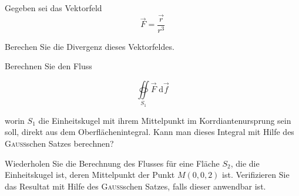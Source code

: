\begin{atiTask}[
  title = Anwendbarkeit des GAUSSschen Satzes,
]

Gegeben sei das Vektorfeld
\[
\vec{F}=\frac{\vec{r}}{r^3}
\]
\begin{atiSubtasks}
\item Berechen Sie die Divergenz dieses Vektorfeldes.
\item Berechnen Sie den Fluss

\[\oiint\limits_{S_1} \vec{F}\;\mathrm{d}\vec{f}
\]


worin $S_1$ die Einheitskugel mit ihrem Mittelpunkt im Korrdiantenursprung sein soll, direkt aus dem Oberflächenintegral. Kann man dieses Integral mit Hilfe des \textsc{Gauss}schen Satzes berechnen?
\item Wiederholen Sie die Berechnung des Flusses für eine Fläche $S_2$, die die Einheitskugel ist, deren Mittelpunkt der Punkt $M(0,0,2)$ ist. Verifizieren Sie das Resultat mit Hilfe des \textsc{Gauss}schen Satzes, falls dieser anwendbar ist.
\end{atiSubtasks}

\end{atiTask}

\begin{atiSolution}

\end{atiSolution}